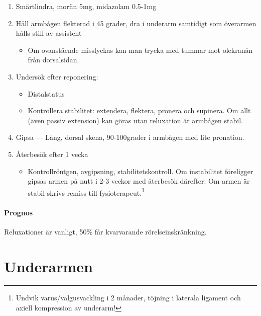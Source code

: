 \documentclass[
  letterpaper,
  DIV=11,
  numbers=noendperiod]{scrreport}
\let\oldparagraph\paragraph
\renewcommand{\paragraph}[1]{\oldparagraph{#1}\mbox{}}
\providecommand{\tightlist}{%
  \setlength{\itemsep}{0pt}\setlength{\parskip}{0pt}}\usepackage{longtable,booktabs,array}
\begin{document}
\begin{enumerate}
\def\labelenumi{\arabic{enumi}.}
\tightlist
\item
  Smärtlindra, morfin 5mg, midazolam 0.5-1mg\\
\item
  Håll armbågen flekterad i 45 grader, dra i underarm samtidigt som
  överarmen hålls still av assistent

  \begin{itemize}
  \tightlist
  \item
    Om ovanstående misslyckas kan man trycka med tummar mot olekranån
    från dorsalsidan.
  \end{itemize}
\item
  Undersök efter reponering:

  \begin{itemize}
  \tightlist
  \item
    Distalstatus
  \item
    Kontrollera stabilitet: extendera, flektera, pronera och supinera.
    Om allt (även passiv extension) kan göras utan reluxation är
    armbågen stabil.
  \end{itemize}
\item
  Gipsa --- Lång, dorsal skena, 90-100grader i armbågen med lite
  pronation.
\item
  Återbesök efter 1 vecka

  \begin{itemize}
  \tightlist
  \item
    Kontrollröntgen, avgipsning, stabilitetskontroll. Om instabilitet
    föreligger gipsas armen på nutt i 2-3 veckor med återbesök därefter.
    Om armen är stabil skrivs remiss till fysioterapeut.\footnote{Undvik
      varus/valgusvackling i 2 månader, töjning i laterala ligament och
      axiell kompression av underarm!}
  \end{itemize}
\end{enumerate}

\hypertarget{prognos-2}{%
\paragraph{Prognos}\label{prognos-2}}

Reluxationer är vanligt, 50\% får kvarvarande rörelseinskränkning.

\hypertarget{underarmen}{%
\section{Underarmen}\label{underarmen}}
\end{document}
